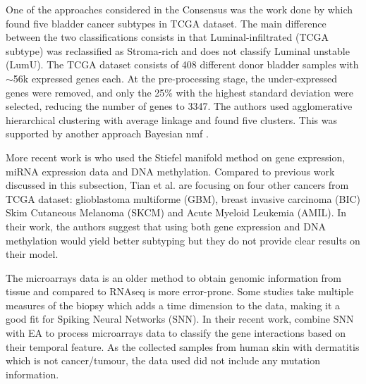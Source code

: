 

One of the approaches considered in the Consensus was the work done by \citet{Robertson2017-mg} which found five bladder cancer subtypes in TCGA dataset. The main difference between the two classifications consists in that Luminal-infiltrated (TCGA subtype) was reclassified as Stroma-rich and \citet{Robertson2017-mg} does not classify Luminal unstable (LumU). The TCGA dataset consists of 408 different donor bladder samples with  $\sim$56k expressed genes each. At the pre-processing stage, the under-expressed genes were removed, and only the 25\% with the highest standard deviation were selected, reducing the number of genes to 3347. The authors used agglomerative hierarchical clustering with average linkage and found five clusters. This was supported by another approach Bayesian \acrfull{nmf} \cite{Schmidt2009-zh}.

 
More recent work is \citet{Tian2021-vu} who used the Stiefel manifold method on gene expression, miRNA expression data and DNA methylation. Compared to previous work discussed in this subsection, Tian et al. are focusing on four other cancers from TCGA dataset: glioblastoma multiforme (GBM), breast invasive carcinoma (BIC) Skim Cutaneous Melanoma (SKCM) and Acute Myeloid Leukemia (AMIL). In their work, the authors suggest that using both gene expression and DNA methylation would yield better subtyping but they do not provide clear results on their model.

The microarrays data is an older method to obtain genomic information from tissue and compared to RNAseq is more error-prone. Some studies take multiple measures of the biopsy which adds a time dimension to the data, making it a good fit for Spiking Neural Networks (SNN). In their recent work, \citet{Capecci2020-uj} combine SNN with EA to process microarrays data to classify the gene interactions based on their temporal feature. As the collected samples from human skin with dermatitis which is not cancer/tumour, the data used did not include any mutation information. 


